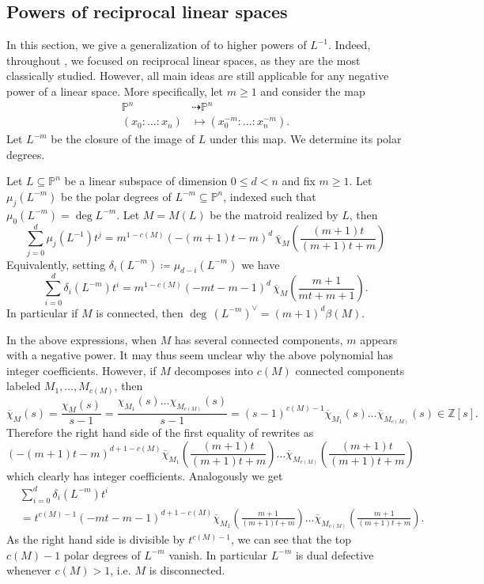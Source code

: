 \documentclass[12pt,a4paper,english]{scrartcl}
\newcommand{\ZZ}{\mathbb{Z}}
\newcommand{\PP}{\mathbb{P}}
\begin{document}
\subsection{Powers of reciprocal linear spaces}

In this section, we give a generalization of  to higher powers of $L^{-1}$. Indeed, throughout , we focused on reciprocal linear spaces, as they are the most classically studied. However, all main ideas are still applicable for any negative power of a linear space. More specifically, let $m \geq 1$ and consider the map
\begin{align*}
    \PP^n &\dashrightarrow \PP^n \\
    (x_0:\dots:x_n) &\mapsto (x_0^{-m}:\dots:x_n^{-m}).
\end{align*}
Let $L^{-m}$ be the closure of the image of $L$ under this map. We determine its polar degrees.

\begin{theorem}\label{thm: polardegswithk}
Let $L\subseteq \PP^n$ be a linear subspace of dimension $0\leq d<n$ and fix $m\geq 1$. Let $\mu_j(L^{-m})$ be the polar degrees of $L^{-m} \subseteq \PP^n$, indexed such that $\mu_0(L^{-m}) = \deg L^{-m}$. Let $M=M(L)$ be the matroid realized by $L$, then
    \[
    \sum_{j = 0}^d \mu_j(L^{-1})t^j = m^{1-c(M)}(-(m+1)t-m)^{d}\, \overline{\chi}_M\left(\frac{(m+1)t}{(m+1)t+m}\right)
    \]
Equivalently, setting $\delta_i(L^{-m}) \coloneq \mu_{d-i}(L^{-m})$ we have
\[
\sum_{i = 0}^d \delta_i(L^{-m})t^i = m^{1-c(M)}(-mt-m-1)^{d} \, \overline{\chi}_M\left(\frac{m+1}{mt+m+1}\right).
\]
In particular if $M$ is connected, then $\deg\, (L^{-m})^\vee = (m+1)^d\beta(M)$.
\end{theorem}

In the above expressions, when $M$ has several connected components, $m$ appears with a negative power. It may thus seem unclear why the above polynomial has integer coefficients. However, if $M$ decomposes into $c(M)$ connected components labeled
$M_1, \dots, M_{c(M)}$, then
\[
\overline{\chi}_M(s) = \frac{\chi_M(s)}{s-1} = \frac{\chi_{M_1}(s)\ldots \chi_{M_{c(M)}}(s)}{s-1} = (s-1)^{c(M)-1}\overline{\chi}_{M_1}(s) \dots \overline{\chi}_{M_{c(M)}}(s)\in \ZZ[s].
\]
Therefore the right hand side of the first equality of  rewrites as
    \[
 (-(m+1)t-m)^{d+1-c(M)}\overline{\chi}_{M_1}\left(\frac{(m+1)t}{(m+1)t+m}\right) \ldots \overline{\chi}_{M_{c(M)}}\left(\frac{(m+1)t}{(m+1)t+m}\right)
    \]
which clearly has integer coefficients. Analogously we get 
\begin{align*}
    &\sum_{i= 0}^d\delta_i(L^{-m})t^i\\&=t^{c(M)-1}(-mt-m-1)^{d+1-c(M)} \overline{\chi}_{M_1}\left(\frac{m+1}{(m+1)t+m}\right) \ldots \overline{\chi}_{M_{c(M)}}\left(\frac{m+1}{(m+1)t+m}\right).   
\end{align*}
As the right hand side is divisible by $t^{c(M)-1}$, we can see that the top $c(M)-1$ polar degrees of $L^{-m}$ vanish. In particular $L^{-m}$ is dual defective whenever $c(M)>1$, i.e. $M$ is disconnected.
\end{document}
